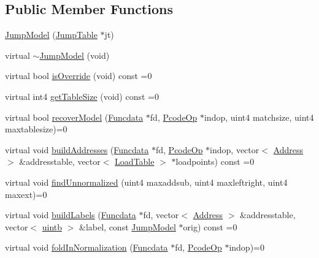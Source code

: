 \subsection*{Public Member Functions}
\begin{DoxyCompactItemize}
\item 
\mbox{\hyperlink{class_jump_model_a06597a23cf38ace8d12285c958f1de06}{Jump\+Model}} (\mbox{\hyperlink{class_jump_table}{Jump\+Table}} $\ast$jt)
\item 
virtual \mbox{\hyperlink{class_jump_model_a0a3d042f59013f30e86f6955c1066ce8}{$\sim$\+Jump\+Model}} (void)
\item 
virtual bool \mbox{\hyperlink{class_jump_model_af54c70c0bcedfcf45ed1ce6895d9e2db}{is\+Override}} (void) const =0
\item 
virtual int4 \mbox{\hyperlink{class_jump_model_acbc757d5fe05e9e8cb15697ddc73f367}{get\+Table\+Size}} (void) const =0
\item 
virtual bool \mbox{\hyperlink{class_jump_model_a9c2326278dd18c9d78dd5cd5795e802b}{recover\+Model}} (\mbox{\hyperlink{class_funcdata}{Funcdata}} $\ast$fd, \mbox{\hyperlink{class_pcode_op}{Pcode\+Op}} $\ast$indop, uint4 matchsize, uint4 maxtablesize)=0
\item 
virtual void \mbox{\hyperlink{class_jump_model_a12659a93442cc2940a8fed8dc55be2e0}{build\+Addresses}} (\mbox{\hyperlink{class_funcdata}{Funcdata}} $\ast$fd, \mbox{\hyperlink{class_pcode_op}{Pcode\+Op}} $\ast$indop, vector$<$ \mbox{\hyperlink{class_address}{Address}} $>$ \&addresstable, vector$<$ \mbox{\hyperlink{class_load_table}{Load\+Table}} $>$ $\ast$loadpoints) const =0
\item 
virtual void \mbox{\hyperlink{class_jump_model_aac83f52fbf3ee566e760dfabe6e67ee6}{find\+Unnormalized}} (uint4 maxaddsub, uint4 maxleftright, uint4 maxext)=0
\item 
virtual void \mbox{\hyperlink{class_jump_model_af8e7b936b4b51d87b7690693f756ffd6}{build\+Labels}} (\mbox{\hyperlink{class_funcdata}{Funcdata}} $\ast$fd, vector$<$ \mbox{\hyperlink{class_address}{Address}} $>$ \&addresstable, vector$<$ \mbox{\hyperlink{types_8h_a2db313c5d32a12b01d26ac9b3bca178f}{uintb}} $>$ \&label, const \mbox{\hyperlink{class_jump_model}{Jump\+Model}} $\ast$orig) const =0
\item 
virtual void \mbox{\hyperlink{class_jump_model_a8c346de087366515ed90ba1d27012451}{fold\+In\+Normalization}} (\mbox{\hyperlink{class_funcdata}{Funcdata}} $\ast$fd, \mbox{\hyperlink{class_pcode_op}{Pcode\+Op}} $\ast$indop)=0
\item 

\end{DoxyCompactItemize}
